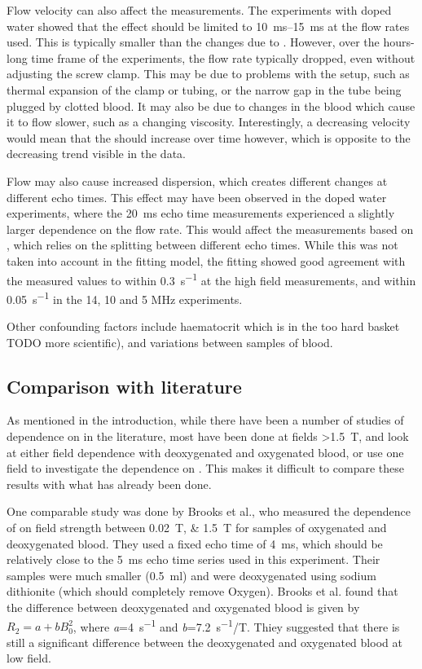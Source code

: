Flow velocity can also affect the \Ttwo measurements.
The experiments with doped water showed that the effect should be limited to \SIrange{10}{15}{ms} at the flow rates used.
This is typically smaller than the changes due to \SOtwo.
However, over the hours-long time frame of the experiments, the flow rate typically dropped, even without adjusting the screw clamp.
This may be due to problems with the setup, such as thermal expansion of the clamp or tubing, or the narrow gap in the tube being plugged by clotted blood.
It may also be due to changes in the blood which cause it to flow slower, such as a changing viscosity.
Interestingly, a decreasing velocity would mean that the \Ttwo should increase over time however, which is opposite to the decreasing trend visible in the data.

Flow may also cause increased dispersion, which creates different \Ttwo changes at different echo times.
This effect may have been observed in the doped water experiments, where the \SI{20}{ms} echo time \Ttwo measurements experienced a slightly larger dependence on the flow rate.
This would affect the measurements based on \Kzero, which relies on the splitting between different echo times.
While this was not taken into account in the fitting model, the \Kzero fitting showed good agreement with the measured \Rtwo values to within \SI{0.3}{s^{-1}} at the high field measurements, and within \SI{0.05}{s^{-1}} in the 14, 10 and 5 MHz experiments.

Other confounding factors include haematocrit which is in the too hard basket TODO more scientific), and variations between samples of blood.

\subsection{Comparison with literature}
\label{sec:contflow-litcomp}
As mentioned in the introduction, while there have been a number of studies of \Ttwo dependence on \SOtwo in the literature, most have been done at fields \SI{>1.5}{T}, and look at either field dependence with deoxygenated and oxygenated blood, or use one field to investigate the dependence on \SOtwo.
This makes it difficult to compare these results with what has already been done.

One comparable study was done by Brooks et al., who measured the dependence of \Ttwo on field strength between \SIlist{0.02;1.5}{T} for samples of oxygenated and deoxygenated blood\cite{BrooksComparisont2relaxation1995}.
They used a fixed echo time of \SI{4}{ms}, which should be relatively close to the \SI{5}{ms} echo time series used in this experiment.
Their samples were much smaller (\SI{0.5}{ml}) and were deoxygenated using sodium dithionite (which should completely remove Oxygen).
Brooks et al. found that the difference between deoxygenated and oxygenated blood is given by $R_2 = a + bB_0^2$, where \textit{a}=\SI{4}{s^{-1}} and \textit{b}=\SI{7.2}{s^{-1}/T}.
Thiey suggested that there is still a significant difference between the deoxygenated and oxygenated blood at low field.

